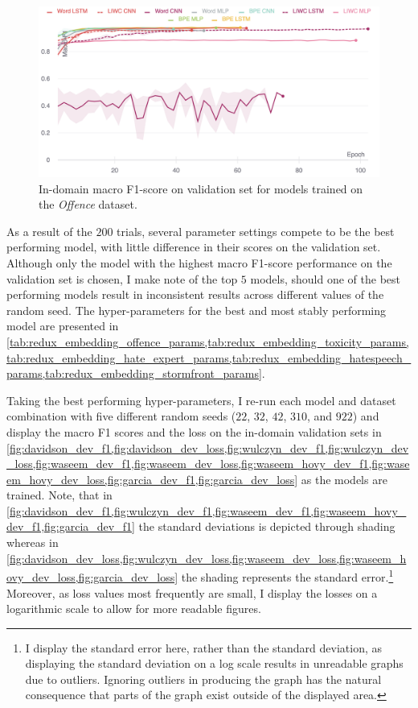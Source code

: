 \begin{figure}
    \centering
    \includegraphics[width=\textwidth]{davidson_dev_f1.pdf}
    \caption{In-domain macro F1-score on validation set for models trained on the \textit{Offence} dataset.}
    \label{fig:davidson_dev_f1}
\end{figure}
As a result of the $200$ trials, several parameter settings compete to be the best performing model, with little difference in their scores on the validation set. Although only the model with the highest macro F1-score performance on the validation set is chosen, I make note of the top $5$ models, should one of the best performing models result in inconsistent results across different values of the random seed. The hyper-parameters for the best and most stably performing model are presented in \cref{tab:redux_embedding_offence_params,tab:redux_embedding_toxicity_params,tab:redux_embedding_hate_expert_params,tab:redux_embedding_hatespeech_params,tab:redux_embedding_stormfront_params}.

Taking the best performing hyper-parameters, I re-run each model and dataset combination with five different random seeds ($22$, $32$, $42$, $310$, and $922$) and display the macro F1 scores and the loss on the in-domain validation sets in \cref{fig:davidson_dev_f1,fig:davidson_dev_loss,fig:wulczyn_dev_f1,fig:wulczyn_dev_loss,fig:waseem_dev_f1,fig:waseem_dev_loss,fig:waseem_hovy_dev_f1,fig:waseem_hovy_dev_loss,fig:garcia_dev_f1,fig:garcia_dev_loss} as the models are trained.
Note, that in \cref{fig:davidson_dev_f1,fig:wulczyn_dev_f1,fig:waseem_dev_f1,fig:waseem_hovy_dev_f1,fig:garcia_dev_f1} the standard deviations is depicted through shading whereas in \cref{fig:davidson_dev_loss,fig:wulczyn_dev_loss,fig:waseem_dev_loss,fig:waseem_hovy_dev_loss,fig:garcia_dev_loss} the shading represents the standard error.\footnote{I display the standard error here, rather than the standard deviation, as displaying the standard deviation on a log scale results in unreadable graphs due to outliers. Ignoring outliers in producing the graph has the natural consequence that parts of the graph exist outside of the displayed area.}
Moreover, as loss values most frequently are small, I display the losses on a  logarithmic scale to allow for more readable figures.\vspace{5mm}

